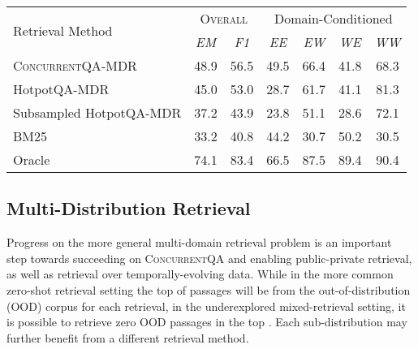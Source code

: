 \documentclass{article}
\renewcommand\cite{\citep}	\newcommand\shortcite{\citeyearpar}\newcommand\newcite{\citet}
\newcommand{\datasetname}{\textsc{ConcurrentQA}\xspace}
\begin{document}
\begin{table*}[t!]
        \begin{center}
    \normalsize
    \begin{tabular}{lcc|cccc}
    \toprule
       \multirow{2}{*}{Retrieval Method}  &      \multicolumn{2}{p{2.7cm}}{\centering \textsc{Overall}} &     \multicolumn{4}{p{4cm}}{\centering Domain-Conditioned}  \\
    & \emph{EM}  &   \emph{F1}    & \emph{EE} & \emph{EW} & \emph{WE} & \emph{WW} \\

    \midrule
    \datasetname-MDR    & 48.9 & 56.5 & 49.5 & 66.4 & 41.8 & 68.3 \\
    HotpotQA-MDR   & 45.0 & 53.0 & 28.7 & 61.7 & 41.1 & 81.3 \\
    Subsampled HotpotQA-MDR  & 37.2 & 43.9 & 23.8 & 51.1 & 28.6 & 72.1 \\
    BM25            & 33.2 & 40.8 & 44.2 & 30.7 & 50.2 & 30.5 \\
    \midrule
    Oracle & 74.1 & 83.4 & 66.5 & 87.5 & 89.4 & 90.4 \\
    \bottomrule
    \end{tabular}\normalsize
    \caption{\datasetname results using four retrieval approaches, and oracle retrieval. On the right, we show performance (F1 scores) by the domains of the  and  gold passages for each question, where email is ``E'' and Wikipedia is ``W''. ``EW'' indicates the  gold passage is an email, and  gold passage is from Wikipedia.}
    \vspace{-2mm}
    \label{tab:concurrent_baselines}
    \end{center}
\end{table*}


\subsection{Multi-Distribution Retrieval}
\label{sec:multiretrieve}
Progress on the more general multi-domain retrieval problem is an important step towards succeeding on \datasetname and enabling public-private retrieval, as well as retrieval over temporally-evolving data. While in the more common zero-shot retrieval setting \cite{guoa2021multireqa, thakur2021beir} the top  of  passages will be from the out-of-distribution (OOD) corpus for each retrieval, in the underexplored mixed-retrieval setting, it is possible to retrieve zero OOD passages in the top . Each sub-distribution may further benefit from a different retrieval method. 
\end{document}
